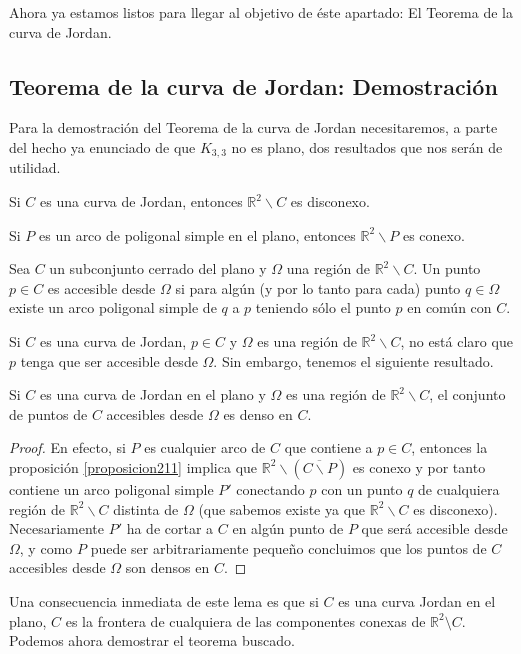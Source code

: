 Ahora ya estamos listos para llegar al objetivo de éste apartado: El Teorema de la curva de Jordan.

\subsection{Teorema de la curva de Jordan: Demostración}

Para la demostración del Teorema de la curva de Jordan necesitaremos, a parte del hecho ya enunciado de que $K_{3,3}$ no es plano, dos resultados que nos serán de utilidad.

\begin{lemma}\label{proposicion26}
	Si $C$ es una curva de Jordan, entonces $\mathbb{R}^{2} \backslash C$ es disconexo.
\end{lemma}
	
\begin{proposition}\label{proposicion211}
	Si $P$ es un arco de poligonal simple en el plano, entonces $\mathbb{R}^2 \backslash P$ es conexo.
\end{proposition}

\begin{definition}
	Sea $C$ un subconjunto cerrado del plano y $\Omega$ una región de $\mathbb{R}^2 \backslash C$. Un punto $p \in C$ es accesible desde $\Omega$ si para algún (y por lo tanto para cada) punto $q \in \Omega$ existe un arco poligonal simple de $q$ a $p$ teniendo sólo el punto $p$ en común con $C$.
\end{definition}

Si $C$ es una curva de Jordan, $p\in C$ y $\Omega$ es una región de  $\mathbb{R}^2 \backslash C$,  no está claro que $p$ tenga que ser accesible desde $\Omega$. Sin embargo, tenemos el siguiente resultado.

\begin{lemma}
Si $C$ es una curva de Jordan en el plano y $\Omega$ es una región de  $\mathbb{R}^2 \backslash C$, el conjunto de puntos de $C$  accesibles desde $\Omega$  es denso en $C$.
\end{lemma}
\begin{proof} En efecto, si $P$ es cualquier arco de $C$ que contiene a $p\in C$, entonces la proposición \ref{proposicion211} implica que $\mathbb{R}^2 \backslash (\overline{C \backslash P})$ es conexo y por tanto contiene un arco poligonal simple $P'$ conectando $p$ con un punto  $q$ de cualquiera región de $\mathbb{R}^2 \backslash C$ distinta de $\Omega$ (que sabemos existe ya que $\mathbb{R}^2 \backslash C$  es disconexo). Necesariamente  $P'$ ha de cortar a $C$ en algún punto de $P$ que será accesible desde $\Omega$, y como $P$ puede ser  arbitrariamente pequeño  concluimos que los puntos de $C$ accesibles desde $\Omega$ son densos en $C$. 
\end{proof}
Una consecuencia inmediata de este lema es que si $C$ es una curva Jordan  en el plano, $C$ es la frontera de cualquiera de las componentes conexas de $\mathbb{R}^2\setminus C$.
Podemos ahora demostrar el teorema buscado.

